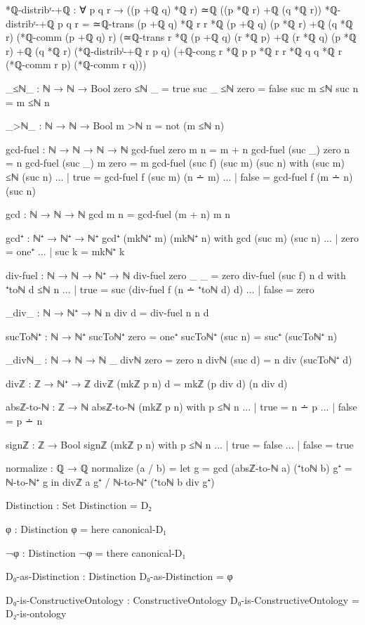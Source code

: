 \documentclass[11pt,a4paper]{book}
\begin{document}
\begin{code}
*ℚ-distribʳ-+ℚ : ∀ p q r → ((p +ℚ q) *ℚ r) ≃ℚ ((p *ℚ r) +ℚ (q *ℚ r))
*ℚ-distribʳ-+ℚ p q r = 
  ≃ℚ-trans {(p +ℚ q) *ℚ r} {r *ℚ (p +ℚ q)} {(p *ℚ r) +ℚ (q *ℚ r)}
    (*ℚ-comm (p +ℚ q) r)
    (≃ℚ-trans {r *ℚ (p +ℚ q)} {(r *ℚ p) +ℚ (r *ℚ q)} {(p *ℚ r) +ℚ (q *ℚ r)}
      (*ℚ-distribˡ-+ℚ r p q)
      (+ℚ-cong {r *ℚ p} {p *ℚ r} {r *ℚ q} {q *ℚ r} 
               (*ℚ-comm r p) (*ℚ-comm r q)))

_≤ℕ_ : ℕ → ℕ → Bool
zero  ≤ℕ _     = true
suc _ ≤ℕ zero  = false
suc m ≤ℕ suc n = m ≤ℕ n

_>ℕ_ : ℕ → ℕ → Bool
m >ℕ n = not (m ≤ℕ n)

gcd-fuel : ℕ → ℕ → ℕ → ℕ
gcd-fuel zero    m n       = m + n
gcd-fuel (suc _) zero n    = n
gcd-fuel (suc _) m zero    = m
gcd-fuel (suc f) (suc m) (suc n) with (suc m) ≤ℕ (suc n)
... | true  = gcd-fuel f (suc m) (n ∸ m)
... | false = gcd-fuel f (m ∸ n) (suc n)

gcd : ℕ → ℕ → ℕ
gcd m n = gcd-fuel (m + n) m n

gcd⁺ : ℕ⁺ → ℕ⁺ → ℕ⁺
gcd⁺ (mkℕ⁺ m) (mkℕ⁺ n) with gcd (suc m) (suc n)
... | zero  = one⁺
... | suc k = mkℕ⁺ k


div-fuel : ℕ → ℕ → ℕ⁺ → ℕ
div-fuel zero    _       _ = zero
div-fuel (suc f) n d with ⁺toℕ d ≤ℕ n
... | true  = suc (div-fuel f (n ∸ ⁺toℕ d) d)
... | false = zero

_div_ : ℕ → ℕ⁺ → ℕ
n div d = div-fuel n n d

sucToℕ⁺ : ℕ → ℕ⁺
sucToℕ⁺ zero = one⁺
sucToℕ⁺ (suc n) = suc⁺ (sucToℕ⁺ n)


_divℕ_ : ℕ → ℕ → ℕ
_ divℕ zero = zero
n divℕ (suc d) = n div (sucToℕ⁺ d)

divℤ : ℤ → ℕ⁺ → ℤ
divℤ (mkℤ p n) d = mkℤ (p div d) (n div d)

absℤ-to-ℕ : ℤ → ℕ
absℤ-to-ℕ (mkℤ p n) with p ≤ℕ n
... | true  = n ∸ p
... | false = p ∸ n

signℤ : ℤ → Bool
signℤ (mkℤ p n) with p ≤ℕ n
... | true  = false
... | false = true

normalize : ℚ → ℚ
normalize (a / b) = 
  let g = gcd (absℤ-to-ℕ a) (⁺toℕ b)
      g⁺ = ℕ-to-ℕ⁺ g
  in divℤ a g⁺ / ℕ-to-ℕ⁺ (⁺toℕ b div g⁺)

Distinction : Set
Distinction = D₂

φ : Distinction
φ = here canonical-D₁

¬φ : Distinction
¬φ = there canonical-D₁

D₀-as-Distinction : Distinction
D₀-as-Distinction = φ

D₀-is-ConstructiveOntology : ConstructiveOntology
D₀-is-ConstructiveOntology = D₂-is-ontology


\end{code}
\end{document}
